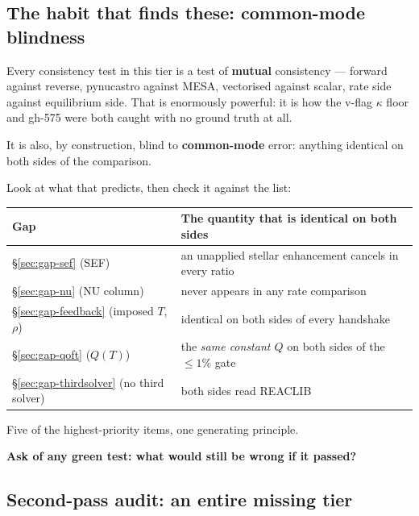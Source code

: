 \subsection{The habit that finds these: common-mode blindness}
\label{sec:commonmode}

Every consistency test in this tier is a test of \textbf{mutual} consistency ---
forward against reverse, pynucastro against MESA, vectorised against scalar,
rate side against equilibrium side. That is enormously powerful: it is how the
v-flag $\kappa$ floor and gh-575 were both caught with no ground truth at all.

It is also, by construction, blind to \textbf{common-mode} error: anything
identical on both sides of the comparison.

Look at what that predicts, then check it against the list:

\begin{center}
\begin{tabularx}{\textwidth}{@{}L{5.4cm} Y@{}}
\toprule
\textbf{Gap} & \textbf{The quantity that is identical on both sides} \\
\midrule
\S\ref{sec:gap-sef} (SEF) &
  an unapplied stellar enhancement cancels in every ratio \\
\S\ref{sec:gap-nu} (NU column) & never appears in any rate comparison \\
\S\ref{sec:gap-feedback} (imposed $T$, $\rho$) &
  identical on both sides of every handshake \\
\S\ref{sec:gap-qoft} ($Q(T)$) &
  the \emph{same constant $Q$} on both sides of the $\le1\%$ gate \\
\S\ref{sec:gap-thirdsolver} (no third solver) & both sides read REACLIB \\
\bottomrule
\end{tabularx}
\end{center}

Five of the highest-priority items, one generating principle.

\begin{invariant}
\textbf{Ask of any green test: what would still be wrong if it passed?}
\end{invariant}

\subsection{Second-pass audit: an entire missing tier}
\label{sec:tier4}


